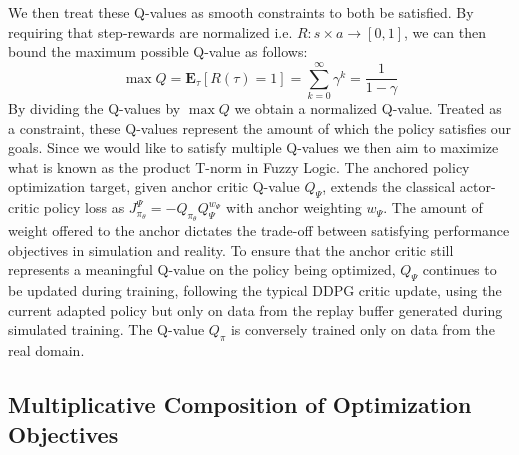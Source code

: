 \documentclass[letterpaper, 10 pt, conference]{ieeeconf} %
\begin{document}
    We then treat these Q-values as smooth constraints to both be satisfied.
    By requiring that step-rewards are normalized i.e. $R: s\times a \to [0,1]$, we can then bound the maximum possible Q-value as follows:
    \begin{equation}
        \max Q = \mathbf{E}_{\tau}[R(\tau) = 1]
         = \sum^{\infty}_{k=0} \gamma^k = \frac{1}{1-\gamma}
    \end{equation}
    By dividing the Q-values by $\max Q$ we obtain a normalized Q-value.
    Treated as a constraint, these Q-values represent the amount of which the policy satisfies our goals.
    Since we would like to satisfy multiple Q-values we then aim to maximize what is known as the product T-norm in Fuzzy Logic.
    The anchored policy optimization target, given anchor critic Q-value $Q_{\Psi}$, extends the classical actor-critic policy loss as
    $
        J_{\pi_\theta}^{\Psi} = -Q_{\pi_\theta} Q_{\Psi}^{w_\Psi}
    $
    with anchor weighting $w_\Psi$.
    The amount of weight offered to the anchor dictates the trade-off between satisfying performance objectives in simulation and reality.
    To ensure that the anchor critic still represents a meaningful Q-value on the policy being optimized, $Q_{\Psi}$ continues to be updated during training, following the typical DDPG critic update, using the current adapted policy but only on data from the replay buffer generated during simulated training.
    The Q-value $Q_{\pi}$ is conversely trained only on data from the real domain.


    
    \subsection{Multiplicative Composition of Optimization Objectives}\label{subsec:mult}
    
\end{document}

